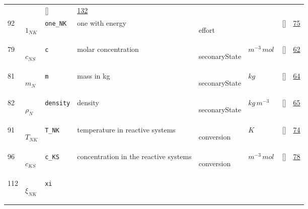 \begin{longtable}{|p{1cm}|p{3cm}|p{3cm}|p{7cm}|p{3.0cm}|p{3cm}|p{2cm}|p{1cm}|}
             & $  $
             & []
             & \hyperlink{"e:132"}{ 132 }
                 \\
    92
             & \hypertarget{"v:92"}{ $ {1}_{{N K}} $}
             & \verb|one_NK|
             & one with energy
             & \begin{lay}effort \end{lay}
             & $  $
             & []
             & \hyperlink{"e:75"}{ 75 }
                 \\
    79
             & \hypertarget{"v:79"}{ $ {c}_{{N S}} $}
             & \verb|c|
             & molar concentration
             & \begin{lay}seconaryState \end{lay}
             & $ m^{-3} \,mol \, $
             & []
             & \hyperlink{"e:62"}{ 62 }
                 \\
    81
             & \hypertarget{"v:81"}{ $ {m}_{N} $}
             & \verb|m|
             & mass in kg
             & \begin{lay}seconaryState \end{lay}
             & $ kg \, $
             & []
             & \hyperlink{"e:64"}{ 64 }
                 \\
    82
             & \hypertarget{"v:82"}{ $ {\rho}_{N} $}
             & \verb|density|
             & density
             & \begin{lay}seconaryState \end{lay}
             & $ kg \,m^{-3} \, $
             & []
             & \hyperlink{"e:65"}{ 65 }
                 \\
    91
             & \hypertarget{"v:91"}{ $ {T}_{{N K}} $}
             & \verb|T_NK|
             & temperature in reactive systems
             & \begin{lay}conversion \end{lay}
             & $ K \, $
             & []
             & \hyperlink{"e:74"}{ 74 }
                 \\
    96
             & \hypertarget{"v:96"}{ $ {c}_{{K S}} $}
             & \verb|c_KS|
             & concentration in the reactive systems
             & \begin{lay}conversion \end{lay}
             & $ m^{-3} \,mol \, $
             & []
             & \hyperlink{"e:78"}{ 78 }
                 \\
    112
             & \hypertarget{"v:112"}{ $ {\xi}_{{N K}} $}
             & \verb|xi|

\end{longtable}
